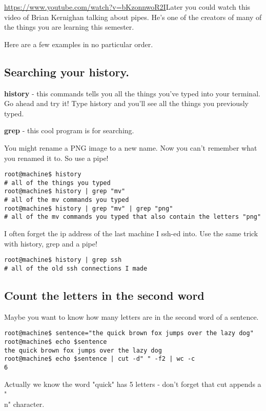 \documentclass[12pt,a4paper]{article}
\begin{document}
\url{https://www.youtube.com/watch?v=bKzonnwoR2I}{Later you could watch this
video of Brian Kernighan talking about pipes.} He's one of the creators of many
of the things you are learning this semester.

Here are a few examples in no particular order.

\subsection{Searching your history.}

\textbf{history} - this commands tells you all the things you've typed into your
terminal. Go ahead and try it! Type history and you'll see all the things you
previously typed.

\textbf{grep} - this cool program is for searching.

You might rename a PNG image to a new name. Now you can't remember what you
renamed it to. So use a pipe!

\begin{lstlisting}[style=term]
root@machine$ history
# all of the things you typed
root@machine$ history | grep "mv"
# all of the mv commands you typed
root@machine$ history | grep "mv" | grep "png"
# all of the mv commands you typed that also contain the letters "png"
\end{lstlisting}

I often forget the ip address of the last machine I ssh-ed into. Use the same
trick with history, grep and a pipe!

\begin{lstlisting}[style=term]
root@machine$ history | grep ssh
# all of the old ssh connections I made
\end{lstlisting}

\subsection{Count the letters in the second word}

Maybe you want to know how many letters are in the second word of a sentence.

\begin{lstlisting}[style=term]
root@machine$ sentence="the quick brown fox jumps over the lazy dog"
root@machine$ echo $sentence
the quick brown fox jumps over the lazy dog
root@machine$ echo $sentence | cut -d" " -f2 | wc -c
6
\end{lstlisting}

Actually we know the word "quick" has 5 letters - don't forget that cut appends
a "\\n" character.
\end{document}

